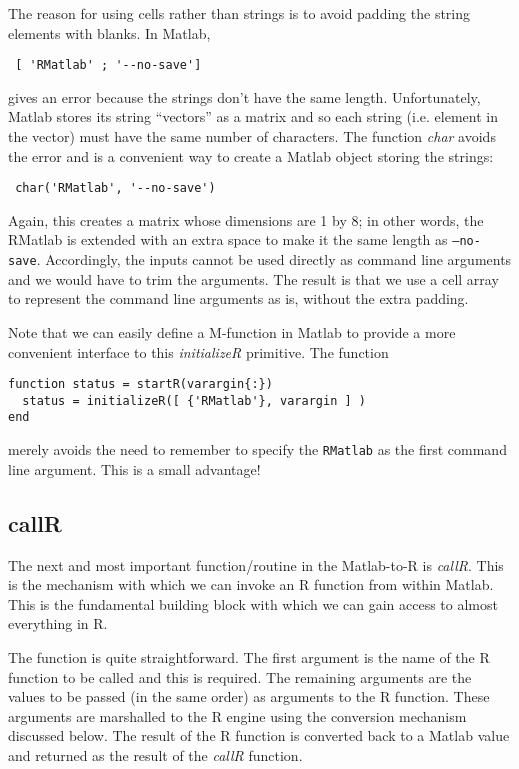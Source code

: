 \documentclass{article}
\def\MatlabFun#1{\textsl{#1}}
\begin{document}
The reason for using cells rather than strings is to avoid padding the
string elements with blanks.  In Matlab,
\begin{verbatim}
 [ 'RMatlab' ; '--no-save']
\end{verbatim}
gives an error because the strings don't have the same length.
Unfortunately, Matlab stores its string ``vectors''
as a matrix and so each string (i.e. element in the vector)
must have the same number of characters.
The function \MatlabFun{char} 
avoids the error and is a convenient way to create
a Matlab object storing the strings:
\begin{verbatim}
 char('RMatlab', '--no-save')
\end{verbatim}
Again, this creates a matrix whose dimensions are 1 by 8; in other
words, the RMatlab is extended with an extra space to make it the same
length as \texttt{--no-save}.  Accordingly, the inputs cannot be used
directly as command line arguments and we would have to trim the
arguments.  The result is that we use a cell array to represent the
command line arguments as is, without the extra padding.


Note that we can easily define a M-function in Matlab to provide a
more convenient interface to this \MatlabFun{initializeR} primitive.
The function
\begin{verbatim}
function status = startR(varargin{:})
  status = initializeR([ {'RMatlab'}, varargin ] )
end
\end{verbatim}
merely avoids the need to remember to specify
the \texttt{RMatlab} as the first command line argument.
This is a small advantage!


\subsection{callR}
The next and most important function/routine in the Matlab-to-R is
\MatlabFun{callR}.  This is the mechanism with which we can invoke an
R function from within Matlab.  This is the fundamental building block
with which we can gain access to almost everything in R.

The function is quite straightforward.  The first argument is the name
of the R function to be called and this is required.  The remaining
arguments are the values to be passed (in the same order) as arguments
to the R function.  These arguments are marshalled to the R engine
using the conversion mechanism discussed below. 
The result of the R function is converted back to a Matlab
value and returned as the result of the 
\MatlabFun{callR} function.
\end{document}
